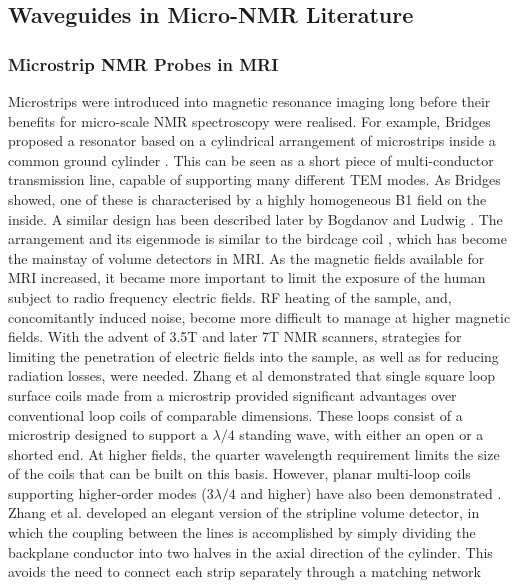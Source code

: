 \subsection{Waveguides in Micro-NMR
Literature}\label{waveguides-in-micro-nmr-literature}

\subsubsection{Microstrip NMR Probes in
MRI}\label{microstrip-nmr-probes-in-mri}

Microstrips were introduced into magnetic resonance imaging long before
their benefits for micro-scale NMR spectroscopy were realised. For
example, Bridges proposed a resonator based on a cylindrical arrangement
of microstrips inside a common ground cylinder \cite{Bridges:1988vz}. This
can be seen as a short piece of multi-conductor transmission line,
capable of supporting many different TEM modes. As Bridges showed, one
of these is characterised by a highly homogeneous B1 field on the
inside. A similar design has been described later by Bogdanov and Ludwig
\cite{Bogdanov:2002gv}. The arrangement and its eigenmode is similar to the
birdcage coil \cite{Hayes:1985bw}, which has become the mainstay of volume
detectors in MRI. As the magnetic fields available for MRI increased, it
became more important to limit the exposure of the human subject to
radio frequency electric fields. RF heating of the sample, and,
concomitantly induced noise, become more difficult to manage at higher
magnetic fields. With the advent of 3.5T and later 7T NMR scanners,
strategies for limiting the penetration of electric fields into the
sample, as well as for reducing radiation losses, were needed. Zhang et
al \cite{Zhang2001js,Zhang2006wc} demonstrated that single square loop
surface coils made from a microstrip provided significant advantages
over conventional loop coils of comparable dimensions. These loops
consist of a microstrip designed to support a
$\lambda/4$ standing wave, with either
an open or a shorted end. At higher fields, the quarter wavelength
requirement limits the size of the coils that can be built on this
basis. However, planar multi-loop coils supporting higher-order modes
($3\lambda/4$ and higher) have also been
demonstrated \cite{Zhang:2005cr}. Zhang et al. developed an elegant version
of the stripline volume detector, in which the coupling between the
lines is accomplished by simply dividing the backplane conductor into
two halves in the axial direction of the cylinder. This avoids the need
to connect each strip separately through a matching network
